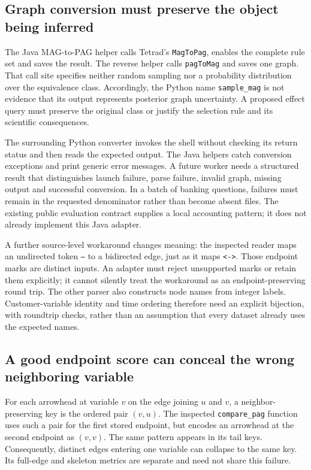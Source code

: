 \subsection{Graph conversion must preserve the object being inferred}
The Java MAG-to-PAG helper calls Tetrad's \texttt{MagToPag}, enables the complete
rule set and saves the result. The reverse helper calls \texttt{pagToMag} and
saves one graph. That call site specifies neither random sampling nor a
probability distribution over the equivalence class. Accordingly, the Python
name \texttt{sample\_mag} is not evidence that its output represents posterior
graph uncertainty. A proposed effect query must preserve the original class
or justify the selection rule and its scientific consequences.
\citep{exec28_nested_sources}

The surrounding Python converter invokes the shell without checking its return
status and then reads the expected output. The Java helpers catch conversion
exceptions and print generic error messages. A future worker needs a structured
result that distinguishes launch failure, parse failure, invalid graph, missing
output and successful conversion. In a batch of banking questions, failures
must remain in the requested denominator rather than become absent files.
The existing public evaluation contract supplies a local accounting pattern;
it does not already implement this Java adapter.\citep{exec28_nested_sources,exec28_fj_contract}

A further source-level workaround changes meaning: the inspected reader maps
an undirected token \texttt{---} to a bidirected edge, just as it maps
\texttt{<->}. Those endpoint marks are distinct inputs. An adapter must reject
unsupported marks or retain them explicitly; it cannot silently treat the
workaround as an endpoint-preserving round trip. The other parser also
constructs node names from integer labels. Customer-variable identity and
time ordering therefore need an explicit bijection, with roundtrip checks,
rather than an assumption that every dataset already uses the expected names.
\citep{exec28_nested_sources}

\subsection{A good endpoint score can conceal the wrong neighboring variable}
For each arrowhead at variable $v$ on the edge joining $u$ and $v$, a
neighbor-preserving key is the ordered pair $(v,u)$. The inspected
\texttt{compare\_pag} function uses such a pair for the first stored endpoint,
but encodes an arrowhead at the second endpoint as $(v,v)$. The same pattern
appears in its tail keys. Consequently, distinct edges entering one variable
can collapse to the same key. Its full-edge and skeleton metrics are separate
and need not share this failure.\citep{exec28_nested_sources}

